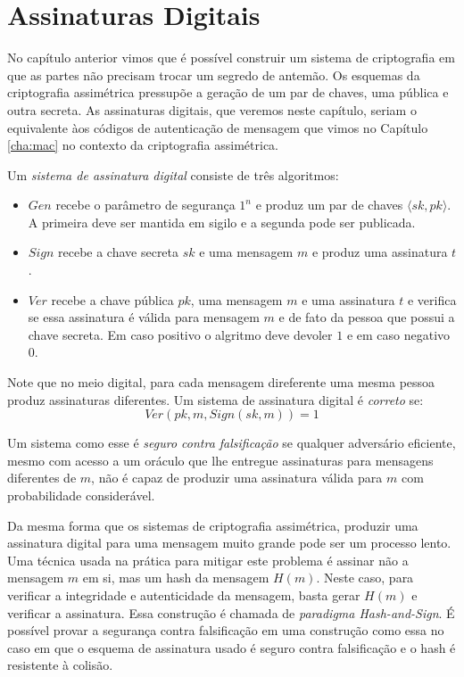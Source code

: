 \chapter{Assinaturas Digitais}
\label{cha:assinaturas-digitais}

No capítulo anterior vimos que é possível construir um sistema de criptografia em que as partes não precisam trocar um segredo de antemão.
Os esquemas da criptografia assimétrica pressupõe a geração de um par de chaves, uma pública e outra secreta.
As assinaturas digitais, que veremos neste capítulo, seriam o equivalente àos códigos de autenticação de mensagem que vimos no Capítulo \ref{cha:mac} no contexto da criptografia assimétrica.

Um {\em sistema de assinatura digital} consiste de três algoritmos:
\begin{itemize}
\item $Gen$ recebe o parâmetro de segurança $1^n$ e produz um par de chaves $\langle sk, pk \rangle$. 
A primeira deve ser mantida em sigilo e a segunda pode ser publicada.
\item $Sign$ recebe a chave secreta $sk$ e uma mensagem $m$ e produz uma assinatura $t$.
\item $Ver$ recebe a chave pública $pk$, uma mensagem $m$ e uma assinatura $t$ e verifica se essa assinatura é válida para mensagem $m$ e de fato da pessoa que possui a chave secreta.
Em caso positivo o algritmo deve devoler $1$ e em caso negativo $0$. 
\end{itemize}

Note que no meio digital, para cada mensagem direferente uma mesma pessoa produz assinaturas diferentes.
Um sistema de assinatura digital é {\em correto} se:
\begin{displaymath}
  Ver(pk, m, Sign(sk, m)) = 1
\end{displaymath}
 
Um sistema como esse é {\em seguro contra falsificação} se qualquer adversário eficiente, mesmo com acesso a um oráculo que lhe entregue assinaturas para mensagens diferentes de $m$, não é capaz de produzir uma assinatura válida para $m$ com probabilidade considerável.

Da mesma forma que os sistemas de criptografia assimétrica, produzir uma assinatura digital para uma mensagem muito grande pode ser um processo lento.
Uma técnica usada na prática para mitigar este problema é assinar não a mensagem $m$ em si, mas um hash da mensagem $H(m)$.
Neste caso, para verificar a integridade e autenticidade da mensagem, basta gerar $H(m)$ e verificar a assinatura.
Essa construção é chamada de {\em paradigma Hash-and-Sign}.
É possível provar a segurança contra falsificação em uma construção como essa no caso em que o esquema de assinatura usado é seguro contra falsificação e o hash é resistente à colisão.


